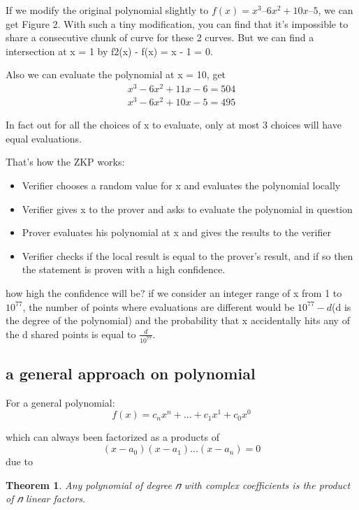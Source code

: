 \documentclass[a4paper,11pt]{article}
\newtheorem{myTh}{Theorem}
\begin{document}
If we modify the original polynomial slightly to $f(x) = x^3 – 6x^2 + 10x – 5$, we can get Figure 2. With such a tiny modification, you can find that it's impossible to share a consecutive chunk of curve for these 2 curves. 
But we can find a intersection at x = 1 by f2(x) - f(x) = x - 1 = 0.

Also we can evaluate the polynomial at x = 10,  get
\begin{displaymath}
\begin{split}
x^3 - 6x^2 + 11x - 6 = 504  \\
x^3 - 6x^2 + 10x - 5 = 495
\end{split}
\end{displaymath}

In fact out for all the choices of x to evaluate, only  at most 3 choices will have equal evaluations. 

That's how the ZKP works:

\begin {itemize}
\item Verifier chooses a random value for x  and evaluates the polynomial locally
\item Verifier gives x to the prover and asks to evaluate the polynomial in question
\item Prover evaluates his polynomial at x and gives the results to the verifier
\item Verifier checks if the local result is equal to the prover's result, and if so then the statement is proven with a high confidence. 
\end{itemize}

how high the confidence will be? if we consider an integer range of x from 1 to $10^{77}$,  the number of points where evaluations are different would be $10^{77} - d$(d is the degree of the polynomial) and the probability that x accidentally hits any of the d shared points is equal to $\frac{d}{10^{77}}$.

\subsection{a general approach on polynomial}

For a general polynomial:  
\begin{equation}
f(x) = c_nx^n + ... + c_1x^1 + c_0x^0  \label{con:gp}
\end{equation}

which can always been factorized as a products of 
\begin{equation}
(x-a_0)(x-a_1)...(x-a_n) = 0
\end{equation}
due to 
\begin {myTh}
Any polynomial of degree 𝑛 with complex coefficients is the product of 𝑛 linear factors.
\end{myTh}
\end{document}
